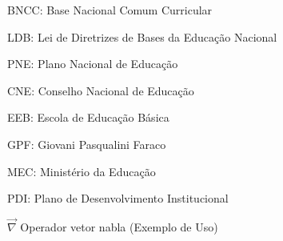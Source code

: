 \listoffigures*
\newpage

\listofquadros*
\cleardoublepage


\listoftables*
\newpage


\begin{siglas}
	\item BNCC:	Base Nacional Comum Curricular
	\item LDB:	Lei de Diretrizes de Bases da Educação Nacional
	\item PNE:	Plano Nacional de Educação
	\item CNE:	Conselho Nacional de Educação
    \item EEB:  Escola de Educação Básica
    \item GPF:	Giovani Pasqualini Faraco
    \item MEC:	Ministério da Educação
    \item PDI:	Plano de Desenvolvimento Institucional
\end{siglas}
\newpage

\begin{simbolos}
    \item[$ \vec{\nabla} $] Operador vetor nabla (Exemplo de Uso)
    
\end{simbolos}